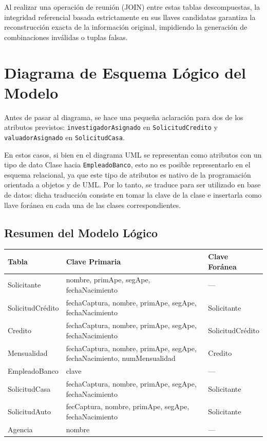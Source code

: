 \documentclass[12pt, a4paper]{article}
\begin{document}
Al realizar una operación de reunión (JOIN) entre estas tablas descompuestas, la integridad referencial basada estrictamente en sus llaves candidatas garantiza la reconstrucción exacta de la información original, impidiendo la generación de combinaciones inválidas o tuplas falsas.

\vspace{0.3cm}
\noindent
{}

\newpage

\section{Diagrama de Esquema Lógico del Modelo}

Antes de pasar al diagrama, se hace una pequeña aclaración para dos de los atributos previstos: \texttt{investigadorAsignado} en \texttt{SolicitudCredito} y \texttt{valuadorAsignado} en \texttt{SolicitudCasa}.

En estos casos, si bien en el diagrama UML se representan como atributos con un tipo de dato Clase hacia \texttt{EmpleadoBanco}, esto no es posible representarlo en el esquema relacional, ya que este tipo de atributos es nativo de la programación orientada a objetos y de UML. Por lo tanto, se traduce para ser utilizado en base de datos: dicha traducción consiste en tomar la clave de la clase e insertarla como llave foránea en cada una de las clases correspondientes.

\subsection*{Resumen del Modelo Lógico}

\begin{center}
\begin{tabular}{lll}
\toprule
\textbf{Tabla} & \textbf{Clave Primaria} & \textbf{Clave Foránea} \\
\midrule
Solicitante & nombre, primApe, segApe, fechaNacimiento & --- \\
SolicitudCrédito & fechaCaptura, nombre, primApe, segApe, fechaNacimiento & Solicitante \\
Credito & fechaCaptura, nombre, primApe, segApe, fechaNacimiento & SolicitudCrédito \\
Mensualidad & fechaCaptura, nombre, primApe, segApe, fechaNacimiento, numMensualidad & Credito \\
EmpleadoBanco & clave & --- \\
SolicitudCasa & fechaCaptura, nombre, primApe, segApe, fechaNacimiento & Solicitante \\
SolicitudAuto & fecCaptura, nombre, primApe, segApe, fechaNacimiento & Solicitante \\
Agencia & nombre & --- \\
\bottomrule
\end{tabular}
\end{center}
\end{document}
